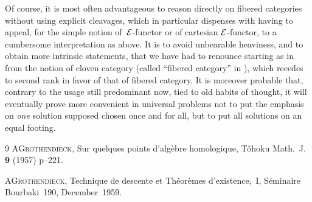 \begin{remark}
Of course, it is most often advantageous to reason
directly on fibered categories without using
explicit cleavages, which in particular dispenses with having to appeal,
for the simple notion of~$\cal{E}$-functor or of cartesian $\cal{E}$-functor,
to a cumbersome interpretation as
above. It is to avoid unbearable heaviness, and to
obtain more intrinsic statements,
that we have had to renounce starting as in \cite{VI.2} from the
notion of cloven category (called ``fibered
category'' in \loccit), which recedes to second rank in favor of
that of fibered category. It is moreover probable that,
contrary to the usage still predominant now,
tied to old habits of thought, it will eventually
prove more convenient in universal problems not to
put the emphasis on \emph{one} solution supposed chosen once
and for all, but to put all solutions on an equal
footing.
\end{remark}

\begin{thebibliography}{9}
 A\ptbl \textsc{Grothendieck}, Sur quelques points d'alg\`ebre
homologique,
T\^ohoku Math.\ J. \textbf{9} (1957) p--221.


 A\ptbl \textsc{Grothendieck}, Technique de descente et
Th\'eor\`emes d'existence,~I, S\'eminaire Bourbaki~190,
December~1959.
\end{thebibliography}

